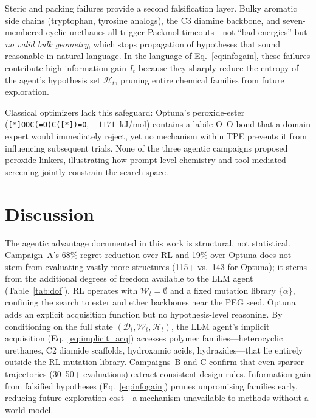 \documentclass[twocolumn]{fairmeta}
\begin{document}
Steric and packing failures provide a second falsification layer.
Bulky aromatic side chains (tryptophan, tyrosine analogs), the C3 diamine backbone, and seven-membered cyclic urethanes all trigger Packmol timeouts---not ``bad energies'' but \emph{no valid bulk geometry}, which stops propagation of hypotheses that sound reasonable in natural language.
In the language of Eq.~\ref{eq:infogain}, these failures contribute high information gain $I_t$ because they sharply reduce the entropy of the agent's hypothesis set $\mathcal{H}_t$, pruning entire chemical families from future exploration.

Classical optimizers lack this safeguard: Optuna's peroxide-ester (\texttt{[*]OOC(=O)C([*])=O}, $-1171$~kJ/mol) contains a labile O--O bond that a domain expert would immediately reject, yet no mechanism within TPE prevents it from influencing subsequent trials.
None of the three agentic campaigns proposed peroxide linkers, illustrating how prompt-level chemistry and tool-mediated screening jointly constrain the search space.

\section{Discussion}

The agentic advantage documented in this work is structural, not statistical.
Campaign~A's 68\% regret reduction over RL and 19\% over Optuna does not stem from evaluating vastly more structures (115+ vs.\ 143 for Optuna); it stems from the additional degrees of freedom available to the LLM agent (Table~\ref{tab:dof}).
RL operates with $\mathcal{W}_t = \emptyset$ and a fixed mutation library $\{\alpha\}$, confining the search to ester and ether backbones near the PEG seed.
Optuna adds an explicit acquisition function but no hypothesis-level reasoning.
By conditioning on the full state $(\mathcal{D}_t, \mathcal{W}_t, \mathcal{H}_t)$, the LLM agent's implicit acquisition (Eq.~\ref{eq:implicit_acq}) accesses polymer families---heterocyclic urethanes, C2 diamide scaffolds, hydroxamic acids, hydrazides---that lie entirely outside the RL mutation library.
Campaigns~B and C confirm that even sparser trajectories (30--50+ evaluations) extract consistent design rules.
Information gain from falsified hypotheses (Eq.~\ref{eq:infogain}) prunes unpromising families early, reducing future exploration cost---a mechanism unavailable to methods without a world model.
\end{document}
